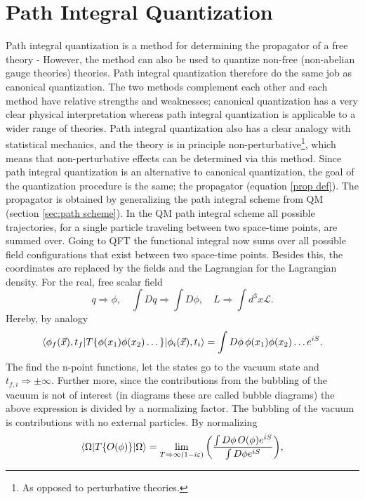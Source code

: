 \section{Path Integral Quantization}		
Path integral quantization is a method for determining the propagator of a free theory - However, the method can also be used to quantize non-free (non-abelian gauge theories) theories. Path integral quantization therefore do the same job as canonical quantization. The two methods complement each other and each method have relative strengths and weaknesses; canonical quantization has a very clear physical interpretation whereas path integral quantization is applicable to a wider range of theories. Path integral quantization also has a clear analogy with statistical mechanics, and the theory is in principle non-perturbative\footnote{As opposed to perturbative theories.}, which means that non-perturbative effects can be determined via this method.
Since path integral quantization is an alternative to canonical quantization, the goal of the quantization procedure is the same; the propagator (equation \eqref{prop def}). The propagator is obtained by generalizing the path integral scheme from QM (section \ref{sec:path scheme}). In the QM path integral scheme all possible trajectories, for a single particle traveling between two space-time points, are summed over. Going to QFT the functional integral now sums over all possible field configurations that exist between two space-time points. Besides this, the coordinates are replaced by the fields and the Lagrangian for the Lagrangian density. For  the real, free scalar field
\begin{equation}
	q\Rightarrow \phi, \quad \int Dq\Rightarrow \int D\phi, \quad L\Rightarrow \int d^3x \mathcal{L}.
\end{equation} 
Hereby, by analogy
\begin{equation}
	\braket{\phi_f(\vec{x}),t_f|T\{\phi(x_1)\phi(x_2)\dots\}|\phi_i(\vec{x}),t_i}=\int D\phi\, \phi(x_1)\phi(x_2)\dots e^{iS}.
\end{equation} 
The find the n-point functions, let the states go to the vacuum state and $t_{f,i}\Rightarrow\pm\infty$. Further more, since the contributions from the bubbling of the vacuum is not of interest (in diagrams these are called bubble diagrams) the above expression is divided by a normalizing factor. The bubbling of the vacuum is contributions with no external particles. By normalizing
\begin{equation}
	\braket{\Omega|T\{O(\phi)\}|\Omega}=\lim\limits_{T\Rightarrow \infty(1-i\varepsilon)}\bigg(\frac{\int D\phi\,O(\phi) e^{iS}}{\int D\phi e^{iS}}\bigg),
\end{equation} 

